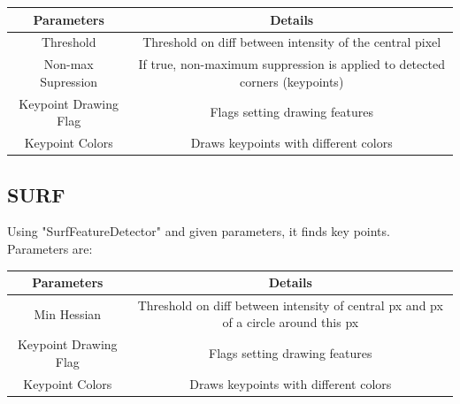 \documentclass{article}
\begin{document}
\begin{table}[H]
\begin{center}
\begin{tabular}{|c|c|l|l|l|}
\hline
\textbf{Parameters}   & \multicolumn{4}{|c|}{\textbf{Details}}                                                                                        \\ \hline
Threshold             & \multicolumn{4}{|c|}{Threshold on diff between intensity of the central pixel} \\ \hline
Non-max Supression    & \multicolumn{4}{|c|}{If true, non-maximum suppression is applied to detected corners (keypoints)}                             \\ \hline
Keypoint Drawing Flag & \multicolumn{4}{|c|}{Flags setting drawing features}                                                                          \\ \hline
Keypoint Colors       & \multicolumn{4}{|c|}{Draws keypoints with different colors}                                                                   \\ \hline
\end{tabular}
\end{center}
\end{table}
	
	\subsection{SURF}
	Using "SurfFeatureDetector" and given parameters, it finds key points. Parameters are:
	
\begin{table}[H]
\begin{center}
\begin{tabular}{|c|c|l|l|l|}
\hline
\textbf{Parameters}   & \multicolumn{4}{|c|}{\textbf{Details}}                                                                                        \\ \hline
Min Hessian           & \multicolumn{4}{|c|}{Threshold on diff between intensity of central px and px of a circle around this px} \\ \hline
Keypoint Drawing Flag & \multicolumn{4}{|c|}{Flags setting drawing features}                                                                          \\ \hline
Keypoint Colors       & \multicolumn{4}{|c|}{Draws keypoints with different colors}                                                                   \\ \hline
\end{tabular}
\end{center}
\end{table}
	
\end{document}
